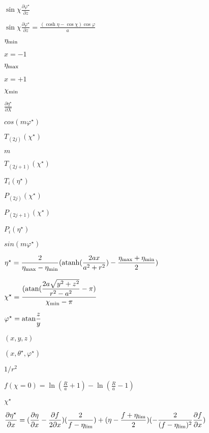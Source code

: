 \documentclass{article}
\begin{document}
$ \sin\chi \displaystyle\frac{\partial \varphi^\star}{\partial z} $
\pagebreak

$ \sin\chi \displaystyle\frac{\partial \varphi^\star}{\partial z} = \displaystyle\frac{(\cosh\eta - \cos\chi) \cos\varphi}{a} $
\pagebreak

$ \eta_{\rm min} $
\pagebreak

$ x = -1 $
\pagebreak

$ \eta_{\rm max} $
\pagebreak

$ x = +1 $
\pagebreak

$ \chi_{\rm min} $
\pagebreak

$ \displaystyle\frac{\partial \eta^\star}{\partial X} $
\pagebreak

$ cos(m\varphi^\star)$
\pagebreak

$ T_(2j) (\chi^\star)$
\pagebreak

$ m $
\pagebreak

$ T_(2j+1) (\chi^\star)$
\pagebreak

$ T_{i} (\eta^\star) $
\pagebreak

$ P_(2j) (\chi^\star)$
\pagebreak

$ P_(2j+1) (\chi^\star)$
\pagebreak

$ P_{i} (\eta^\star) $
\pagebreak

$ sin(m\varphi^\star)$
\pagebreak

$ \eta^\star = \displaystyle\frac{2}{\eta_{\rm max}-\eta_{\rm min}} ({\rm atanh}(\displaystyle\frac{2ax}{a^2+r^2}) - \displaystyle\frac{\eta_{\rm max}+\eta_{\rm min}}{2}) $
\pagebreak

$ \chi^\star = \displaystyle\frac{({\rm atan} (\displaystyle\frac{2a\sqrt{y^2+z^2}}{r^2-a^2} - \pi)} {\chi_{\rm min} - \pi} $
\pagebreak

$ \varphi^\star = {\rm atan} \displaystyle\frac{z}{y} $
\pagebreak

$ (x, y, z) $
\pagebreak

$ (x, \theta^\star, \varphi^\star) $
\pagebreak

$ 1/r^2$
\pagebreak

$ f (\chi=0) = \ln (\frac{R}{a}+1) - \ln (\frac{R}{a}-1) $
\pagebreak

$ \chi^\star $
\pagebreak

$ \displaystyle\frac{\partial \eta^\star}{\partial x } = (\displaystyle\frac{\partial \eta}{\partial x} - \displaystyle\frac{\partial f}{2\partial x}) (\displaystyle\frac{2}{f - \eta_{\rm lim}}) + (\eta - \displaystyle\frac{f+\eta_{\rm lim}}{2}) (-\displaystyle\frac{2}{(f-\eta_{\rm lim})^2} \displaystyle\frac{\partial f}{\partial x}) $
\pagebreak
\end{document}
